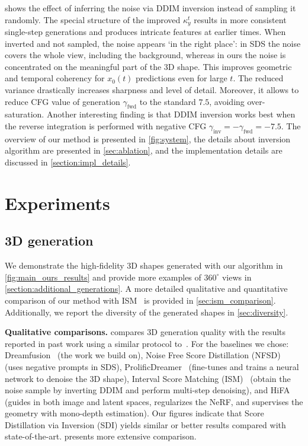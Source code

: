 \documentclass{article}
\begin{document}
 shows the effect of inferring the noise via DDIM inversion instead of sampling it randomly.
The special structure of the improved $\kappa^t_y$ results in more consistent single-step generations and produces intricate features at earlier times.
When inverted and not sampled, the noise appears `in the right place': in SDS the noise covers the whole view, including the background, whereas in ours the noise is concentrated on the meaningful part of the 3D shape. 
This improves geometric and temporal coherency for $x_0(t)$ predictions even for large $t$.
The reduced variance drastically increases sharpness and level of detail.
Moreover, it allows to reduce CFG value of generation $\gamma_{\text{fwd}}$ to the standard $7.5$, avoiding over-saturation.
Another interesting finding is that DDIM inversion works best when the reverse integration is performed with negative CFG $\gamma_{\text{inv}} = -\gamma_{\text{fwd}}=-7.5$.
The overview of our method is presented in \cref{fig:system}, the details about inversion algorithm are presented in \cref{sec:ablation}, and the implementation details are discussed in \cref{section:impl_details}.


\section{Experiments}
\label{sec:experiments}

\subsection{3D generation}
We demonstrate the high-fidelity 3D shapes generated with our algorithm in \cref{fig:main_ours_results} and provide more examples of $360^{\circ}$ views in \cref{section:additional_generations}.
A more detailed qualitative and quantitative comparison of our method with ISM~\cite{liang2023luciddreamer} is provided in \cref{sec:ism_comparison}.
Additionally, we report the diversity of the generated shapes in \cref{sec:diversity}.

\textbf{Qualitative comparisons.}
 compares 3D generation quality with the results reported in past work using a similar protocol to~\cite{wang2024prolificdreamer, katzir2023noise}. 
For the baselines we chose: Dreamfusion~\cite{poole2022dreamfusion} (the work we build on), Noise Free Score Distillation (NFSD)~\cite{katzir2023noise} (uses negative prompts in SDS),
ProlificDreamer~\cite{wang2024prolificdreamer} (fine-tunes and trains a neural network to denoise the 3D shape), Interval Score Matching (ISM)~\cite{liang2023luciddreamer} (obtain the noise sample by inverting DDIM and perform multi-step denoising), and HiFA~\cite{zhu2023hifa} (guides in both image and latent spaces, regularizes the NeRF, and supervises the geometry with mono-depth estimation).
Our figures indicate that Score Distillation via Inversion (SDI) yields similar or better results compared with state-of-the-art.
 presents more extensive comparison.
\end{document}
